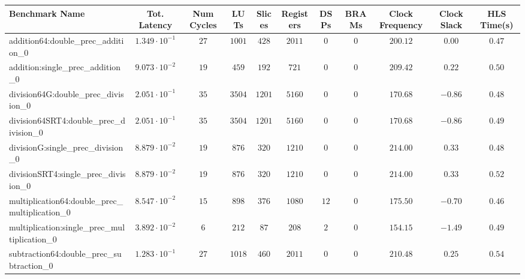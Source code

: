 \begin{tabular}{|l|c|c|c|c|c|c|c|c|c|c|}
\hline
Benchmark Name                                   & Tot. Latency            & Num Cycles & LUTs      & Slices   & Registers & DSPs   & BRAMs & Clock Frequency & Clock Slack & HLS Time(s) \\
\hline
addition64:double\_prec\_addition\_0             & $ 1.349 \cdot 10^{-1} $ & $ 27     $ & $ 1001  $ & $ 428  $ & $ 2011  $ & $ 0  $ & $ 0 $ & $ 200.12      $ & $ 0.00    $ & $ 0.47    $ \\
addition:single\_prec\_addition\_0               & $ 9.073 \cdot 10^{-2} $ & $ 19     $ & $ 459   $ & $ 192  $ & $ 721   $ & $ 0  $ & $ 0 $ & $ 209.42      $ & $ 0.22    $ & $ 0.50    $ \\
division64G:double\_prec\_division\_0            & $ 2.051 \cdot 10^{-1} $ & $ 35     $ & $ 3504  $ & $ 1201 $ & $ 5160  $ & $ 0  $ & $ 0 $ & $ 170.68      $ & $ -0.86   $ & $ 0.48    $ \\
division64SRT4:double\_prec\_division\_0         & $ 2.051 \cdot 10^{-1} $ & $ 35     $ & $ 3504  $ & $ 1201 $ & $ 5160  $ & $ 0  $ & $ 0 $ & $ 170.68      $ & $ -0.86   $ & $ 0.49    $ \\
divisionG:single\_prec\_division\_0              & $ 8.879 \cdot 10^{-2} $ & $ 19     $ & $ 876   $ & $ 320  $ & $ 1210  $ & $ 0  $ & $ 0 $ & $ 214.00      $ & $ 0.33    $ & $ 0.48    $ \\
divisionSRT4:single\_prec\_division\_0           & $ 8.879 \cdot 10^{-2} $ & $ 19     $ & $ 876   $ & $ 320  $ & $ 1210  $ & $ 0  $ & $ 0 $ & $ 214.00      $ & $ 0.33    $ & $ 0.52    $ \\
multiplication64:double\_prec\_multiplication\_0 & $ 8.547 \cdot 10^{-2} $ & $ 15     $ & $ 898   $ & $ 376  $ & $ 1080  $ & $ 12 $ & $ 0 $ & $ 175.50      $ & $ -0.70   $ & $ 0.46    $ \\
multiplication:single\_prec\_multiplication\_0   & $ 3.892 \cdot 10^{-2} $ & $ 6      $ & $ 212   $ & $ 87   $ & $ 208   $ & $ 2  $ & $ 0 $ & $ 154.15      $ & $ -1.49   $ & $ 0.49    $ \\
subtraction64:double\_prec\_subtraction\_0       & $ 1.283 \cdot 10^{-1} $ & $ 27     $ & $ 1018  $ & $ 460  $ & $ 2011  $ & $ 0  $ & $ 0 $ & $ 210.48      $ & $ 0.25    $ & $ 0.54    $ \\

\end{tabular}

